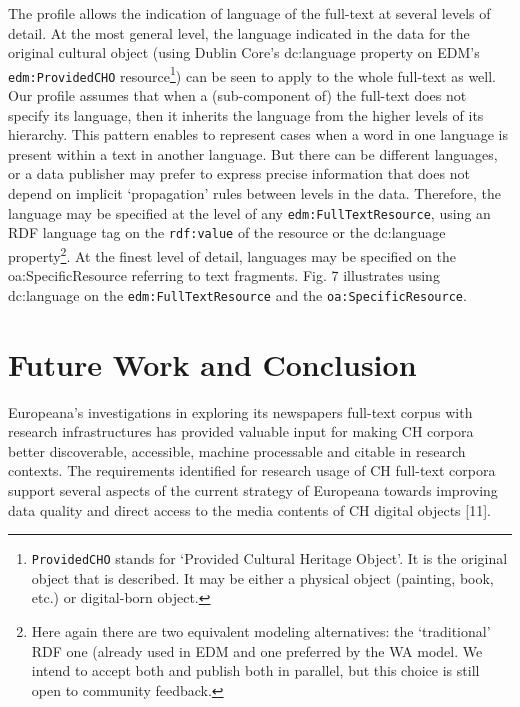 \documentclass[a4paper,UKenglish,cleveref, autoref]{oasics-v2019}
\begin{document}
The profile allows the indication of language of the full-text at several levels of detail. At the most general level, the language indicated in the data for the original cultural object (using Dublin Core's dc:language property on EDM's \verb+edm:ProvidedCHO+
resource\footnote{\verb+ProvidedCHO+ stands for `Provided Cultural Heritage Object'. It is the original object that is described. It may be either a physical object (painting, book, etc.) or digital-born object.})
can be seen to apply to the whole full-text as well. Our profile assumes that when a (sub-component of) the full-text does not specify its language, then it inherits the language from the higher levels of its hierarchy. This pattern enables to represent cases when a word in one language is present within a text in another language. But there can be different languages, or a data publisher may prefer to express precise information that does not depend on implicit `propagation' rules between levels in the data. Therefore, the language may be specified at the level of any \verb+edm:FullTextResource+, using an RDF language tag on the \verb+rdf:value+ of the resource or the dc:language property\footnote{Here again there are two equivalent modeling alternatives: the `traditional’ RDF one (already used in EDM and one preferred by the WA model. We intend to accept both and publish both in parallel, but this choice is still open to community feedback.}.
At the finest level of detail, languages may be specified on the oa:SpecificResource referring to text fragments. Fig. 7 illustrates using dc:language on the \verb+edm:FullTextResource+ and the \verb+oa:SpecificResource+.

\section{Future Work and Conclusion}

Europeana's investigations in exploring its newspapers full-text corpus with research infrastructures has provided valuable input for making CH corpora better discoverable, accessible, machine processable and citable in research contexts. The requirements identified for research usage of CH full-text corpora support several aspects of the current strategy of Europeana towards improving data quality and direct access to the media contents of CH digital objects [11]. 
\end{document}
